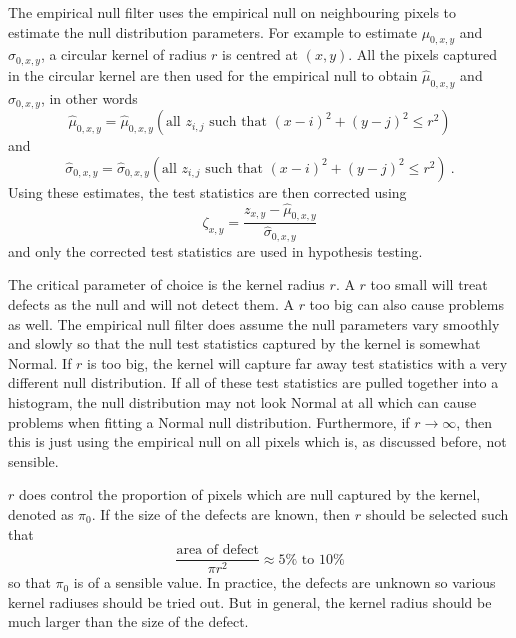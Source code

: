The empirical null filter uses the empirical null on neighbouring pixels to estimate the null distribution parameters. For example to estimate $\mu_{0,x,y}$ and $\sigma_{0,x,y}$, a circular kernel of radius $r$ is centred at $(x,y)$. All the pixels captured in the circular kernel are then used for the empirical null to obtain $\widehat{\mu}_{0,x,y}$ and $\widehat{\sigma}_{0,x,y}$, in other words
\begin{equation}
	\widehat{\mu}_{0,x,y}
	=
	\widehat{\mu}_{0,x,y}
		\left(
			\text{all }z_{i,j}\text{ such that }(x-i)^2+(y-j)^2\leqslant r^2
		\right)
\end{equation}
and
\begin{equation}
	\widehat{\sigma}_{0,x,y}
	=
	\widehat{\sigma}_{0,x,y}
		\left(
			\text{all }z_{i,j}\text{ such that }(x-i)^2+(y-j)^2\leqslant r^2
		\right)
	\ .
\end{equation}
Using these estimates, the test statistics are then corrected using
\begin{equation}
	\zeta_{x,y} = 
	\dfrac{
		z_{x,y}-\widehat{\mu}_{0,x,y}
	}
	{
		\widehat{\sigma}_{0,x,y}
	}
\end{equation}
and only the corrected test statistics are used in hypothesis testing.

The critical parameter of choice is the kernel radius $r$. A $r$ too small will treat defects as the null and will not detect them. A $r$ too big can also cause problems as well. The empirical null filter does assume the null parameters vary smoothly and slowly so that the null test statistics captured by the kernel is somewhat Normal. If $r$ is too big, the kernel will capture far away test statistics with a very different null distribution. If all of these test statistics are pulled together into a histogram, the null distribution may not look Normal at all which can cause problems when fitting a Normal null distribution. Furthermore, if $r\rightarrow \infty$, then this is just using the empirical null on all pixels which is, as discussed before, not sensible.

$r$ does control the proportion of pixels which are null captured by the kernel, denoted as $\pi_0$. If the size of the defects are known, then $r$ should be selected such that
\begin{equation}
\dfrac{
	\text{area of defect}
}
{
	\pi r^2
}
\approx
5\% \text{ to } 10 \%
\end{equation}
so that $\pi_0$ is of a sensible value. In practice, the defects are unknown so various kernel radiuses should be tried out. But in general, the kernel radius should be much larger than the size of the defect.


